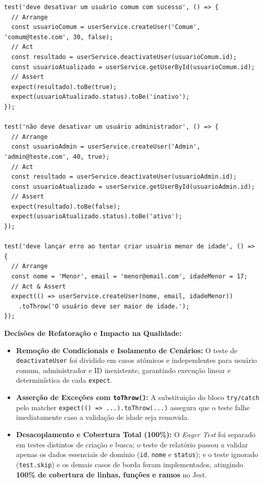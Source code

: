 \documentclass[11pt, a4paper]{article}
\begin{document}
\begin{lstlisting}[caption={Testes limpos desmembrados com o padrão AAA e verificação declarativa via \texttt{toThrow}.}]
test('deve desativar um usuário comum com sucesso', () => {
  // Arrange
  const usuarioComum = userService.createUser('Comum', 'comum@teste.com', 30, false);
  // Act
  const resultado = userService.deactivateUser(usuarioComum.id);
  const usuarioAtualizado = userService.getUserById(usuarioComum.id);
  // Assert
  expect(resultado).toBe(true);
  expect(usuarioAtualizado.status).toBe('inativo');
});

test('não deve desativar um usuário administrador', () => {
  // Arrange
  const usuarioAdmin = userService.createUser('Admin', 'admin@teste.com', 40, true);
  // Act
  const resultado = userService.deactivateUser(usuarioAdmin.id);
  const usuarioAtualizado = userService.getUserById(usuarioAdmin.id);
  // Assert
  expect(resultado).toBe(false);
  expect(usuarioAtualizado.status).toBe('ativo');
});

test('deve lançar erro ao tentar criar usuário menor de idade', () => {
  // Arrange
  const nome = 'Menor', email = 'menor@email.com', idadeMenor = 17;
  // Act & Assert
  expect(() => userService.createUser(nome, email, idadeMenor))
    .toThrow('O usuário deve ser maior de idade.');
});
\end{lstlisting}

\noindent\textbf{Decisões de Refatoração e Impacto na Qualidade:}
\begin{itemize}
    \item \textbf{Remoção de Condicionais e Isolamento de Cenários:} O teste de \texttt{deactivateUser} foi dividido em casos atômicos e independentes para usuário comum, administrador e ID inexistente, garantindo execução linear e determinística de cada \texttt{expect}.
    \item \textbf{Asserção de Exceções com \texttt{toThrow()}:} A substituição do bloco \texttt{try/catch} pelo matcher \texttt{expect(() => ...).toThrow(...)} assegura que o teste falhe imediatamente caso a validação de idade seja removida.
    \item \textbf{Desacoplamento e Cobertura Total (100\%):} O \textit{Eager Test} foi separado em testes distintos de criação e busca; o teste de relatório passou a validar apenas os dados essenciais de domínio (\texttt{id}, \texttt{nome} e \texttt{status}); e o teste ignorado (\texttt{test.skip}) e os demais casos de borda foram implementados, atingindo \textbf{100\% de cobertura de linhas, funções e ramos} no Jest.
\end{itemize}
\end{document}
